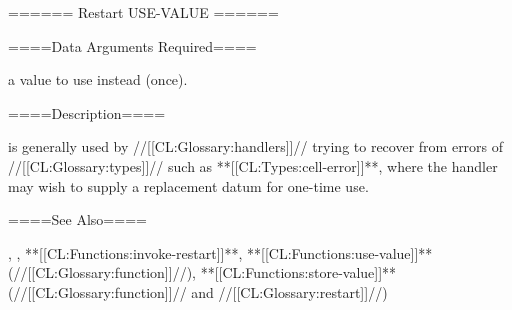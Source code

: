 ====== Restart USE-VALUE ======

====Data Arguments Required====

a value to use instead (once).

====Description====

 is generally used by //[[CL:Glossary:handlers]]// trying to recover from errors of //[[CL:Glossary:types]]// such as **[[CL:Types:cell-error]]**, where the handler may wish to supply a replacement datum for one-time use.

====See Also====

{\secref\Restarts}, {\secref\InterfacesToRestarts}, **[[CL:Functions:invoke-restart]]**, **[[CL:Functions:use-value]]** (//[[CL:Glossary:function]]//), **[[CL:Functions:store-value]]** (//[[CL:Glossary:function]]// and //[[CL:Glossary:restart]]//)

